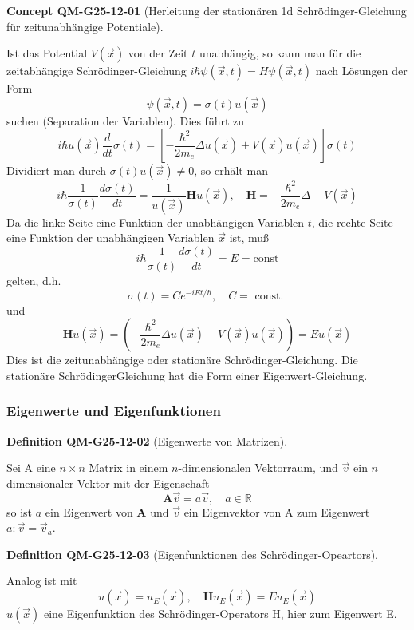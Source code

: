 \documentclass[10pt, letterpaper]{article}
\newcommand{\CustomHeading}[3]{%
  \par\medskip\noindent%
  \textbf{#1 #2} \textnormal{(#3)}.\enskip%
}
\newenvironment{DEF}[2]{\begin{unitbox}\CustomHeading{Definition}{#1}{#2}}{\end{unitbox}}
\newenvironment{CONC}[2]{\begin{unitbox}\CustomHeading{Concept}{#1}{#2}}{\end{unitbox}}
\begin{document}
\begin{CONC}{QM-G25-12-01}{Herleitung der stationären 1d Schrödinger-Gleichung für zeitunabhängige Potentiale}
Ist das Potential $V(\vec{x})$ von der Zeit $t$ unabhängig, so kann man für die zeitabhängige Schrödinger-Gleichung $i \hbar \dot{\psi}(\vec{x}, t)=H \psi(\vec{x}, t)$ nach Lösungen der Form
$$
\psi(\vec{x}, t)=\sigma(t) u(\vec{x})
$$
suchen (Separation der Variablen). Dies führt zu
$$
i \hbar u(\vec{x}) \frac{d}{d t} \sigma(t)=\left[-\frac{\hbar^{2}}{2 m_{e}} \Delta u(\vec{x})+V(\vec{x}) u(\vec{x})\right] \sigma(t)
$$
Dividiert man durch $\sigma(t) u(\vec{x}) \neq 0$, so erhält man
$$
i \hbar \frac{1}{\sigma(t)} \frac{d \sigma(t)}{d t}=\frac{1}{u(\vec{x})} \mathbf{H} u(\vec{x}), \quad \mathbf{H}=-\frac{\hbar^{2}}{2 m_{e}} \Delta+V(\vec{x})
$$
Da die linke Seite eine Funktion der unabhängigen Variablen $t$, die rechte Seite eine Funktion der unabhängigen Variablen $\vec{x}$ ist, muß
$$
i \hbar \frac{1}{\sigma(t)} \frac{d \sigma(t)}{d t}=E=\mathrm{const}
$$
gelten, d.h.
$$
\sigma(t)=C e^{-i E t / \hbar}, \quad C=\text { const. }
$$
und
$$
\mathbf{H} u(\vec{x})=\left(-\frac{\hbar^{2}}{2 m_{e}} \Delta u(\vec{x})+V(\vec{x}) u(\vec{x})\right)=E u(\vec{x})
$$
Dies ist die zeitunabhängige oder stationäre Schrödinger-Gleichung. Die stationäre SchrödingerGleichung hat die Form einer Eigenwert-Gleichung.
\end{CONC}



\subsubsection*{Eigenwerte und Eigenfunktionen}


\begin{DEF}{QM-G25-12-02}{Eigenwerte von Matrizen}
Sei A eine $n \times n$ Matrix in einem $n$-dimensionalen Vektorraum, und $\vec{v}$ ein $n$ dimensionaler Vektor mit der Eigenschaft
$$
\mathbf{A} \vec{v}=a \vec{v}, \quad a \in \mathbb{R}
$$
so ist $a$ ein Eigenwert von $\mathbf{A}$ und $\vec{v}$ ein Eigenvektor von A zum Eigenwert $a: \vec{v}=\vec{v}_{a}$.
\end{DEF}

\begin{DEF}{QM-G25-12-03}{Eigenfunktionen des Schrödinger-Opeartors}
Analog ist mit
$$
u(\vec{x})=u_{E}(\vec{x}), \quad \mathbf{H} u_{E}(\vec{x})=E u_{E}(\vec{x})
$$
$u(\vec{x})$ eine Eigenfunktion des Schrödinger-Operators H, hier zum Eigenwert E.
\end{DEF}
\end{document}
